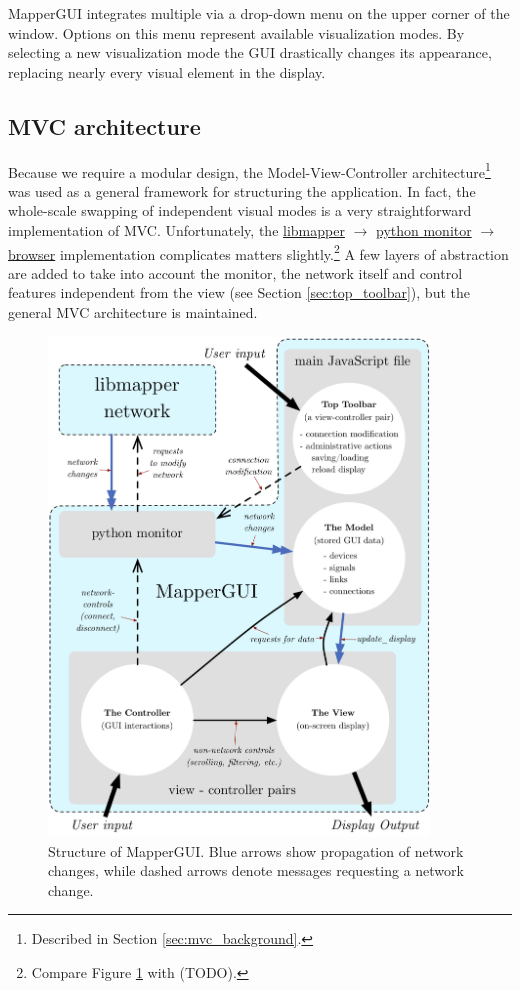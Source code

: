MapperGUI integrates multiple via a drop-down menu on the upper corner of the window. Options on this menu represent available visualization modes. By selecting a new visualization mode the GUI drastically changes its appearance, replacing nearly every visual element in the display.

	\subsection{MVC architecture} %
	\label{sec:mvc_architecture}

Because we require a modular design, the Model-View-Controller architecture\footnote{Described in Section \ref{sec:mvc_background}.} was used as a general framework for structuring the application. In fact, the whole-scale swapping of independent visual modes is a very straightforward implementation of MVC. Unfortunately, the \url{libmapper} $\rightarrow$ \url{python monitor} $\rightarrow$ \url{browser} implementation complicates matters slightly.\footnote{Compare Figure \ref{fig:mapper_network} with (TODO).} A few layers of abstraction are added to take into account the monitor, the network itself and control features independent from the view (see Section \ref{sec:top_toolbar}), but the general MVC architecture is maintained.

\begin{figure}
\centering
	\includegraphics[width=0.9\textwidth]{figures/mapper_network}
\caption{Structure of MapperGUI. Blue arrows show propagation of network changes, while dashed arrows denote messages requesting a network change.}
\label{fig:mapper_network}
\end{figure}


